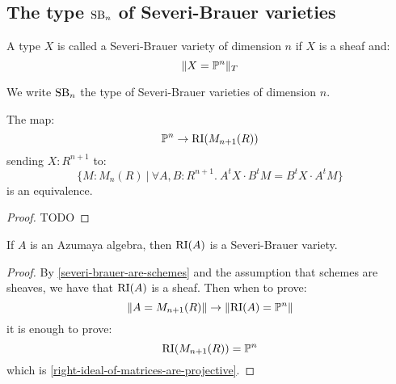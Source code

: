 \subsection{The type $\mathrm{SB}_n$ of Severi-Brauer varieties}

\begin{definition}
A type $X$ is called a Severi-Brauer variety of dimension $n$ if $X$ is a sheaf and:
\[\lVert X=\mathbb{P}^n \rVert_T\]
\end{definition}

We write $\mathrm{SB}_n$ the type of Severi-Brauer varieties of dimension $n$.

\begin{lemma}\label{right-ideal-of-matrices-are-projective}
The map:
\[\mathbb{P}^n \to \mathrm{RI}(M_{n+1}(R))\]
sending $X:R^{n+1}$ to:
\[\{M:M_n(R)\ |\ \forall A,B:R^{n+1}.\ A^t X\cdot B^tM = B^tX\cdot A^tM\}\]
is an equivalence.
\end{lemma}

\begin{proof}
TODO
\end{proof}

\begin{lemma}
If $A$ is an Azumaya algebra, then $\mathrm{RI}(A)$ is a Severi-Brauer variety.
\end{lemma}

\begin{proof}
By \cref{severi-brauer-are-schemes} and the assumption that schemes are sheaves, we have that $\mathrm{RI}(A)$ is a sheaf. Then when to prove:
\[\lVert A=M_{n+1}(R) \rVert \to \lVert \mathrm{RI}(A)=\mathbb{P}^n \rVert\]
it is enough to prove:
\[\mathrm{RI}(M_{n+1}(R)) = \mathbb{P}^n\]
which is \cref{right-ideal-of-matrices-are-projective}.
\end{proof}
